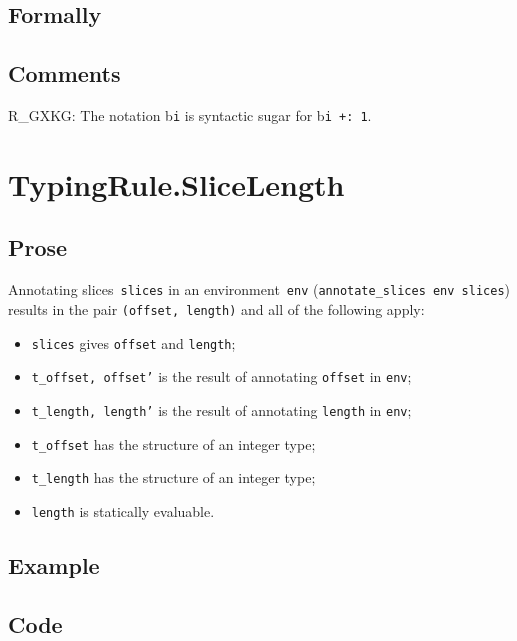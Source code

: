 \documentclass{book}
\begin{document}
\begin{emptyformal}
    \subsection{Formally}
\end{emptyformal}

\subsection{Comments}
    R\_GXKG: The notation b\texttt{i} is syntactic sugar for b\texttt{i +: 1}.

\section{TypingRule.SliceLength \label{sec:TypingRule.SliceLength}}

  \subsection{Prose}
   Annotating slices~\texttt{slices} in an environment~\texttt{env}
(\texttt{annotate\_slices env slices}) results in the pair \texttt{(offset,
length)} and all of the following apply:
   \begin{itemize}
   \item \texttt{slices} gives \texttt{offset} and \texttt{length}; 
   \item \texttt{t\_offset, offset'} is the result of annotating \texttt{offset} in \texttt{env};
   \item \texttt{t\_length, length'} is the result of annotating \texttt{length} in \texttt{env};
   \item \texttt{t\_offset} has the structure of an integer type;
   \item \texttt{t\_length} has the structure of an integer type;
   \item \texttt{length} is statically evaluable.
   \end{itemize}

  \subsection{Example}

  \subsection{Code}
\end{document}

